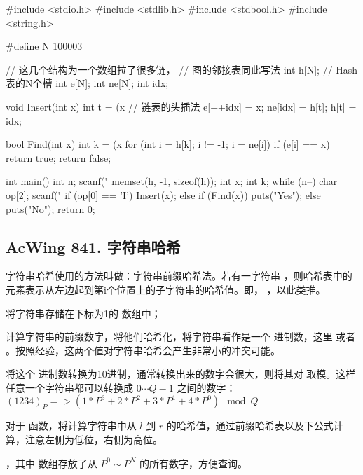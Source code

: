 \begin{mycpptwocol}[拉链法]
    #include <stdio.h>
    #include <stdlib.h>
    #include <stdbool.h>
    #include <string.h>

    #define N 100003

    // 这几个结构为一个数组拉了很多链，
    // 图的邻接表同此写法
    int h[N]; // Hash表的N个槽
    int e[N];
    int ne[N];
    int idx;

    void Insert(int x) {
        int t = (x %
        // 链表的头插法
        e[++idx] = x;
        ne[idx] = h[t];
        h[t] = idx;
    }

    bool Find(int x) {
        int k = (x %
        for (int i = h[k]; i != -1; i = ne[i]) {
            if (e[i] == x) {
                return true;
            }
        }
        return false;
    }

    int main() {
        int n;
        scanf("%
        memset(h, -1, sizeof(h));
        int x;
        int k;
        while (n--) {
            char op[2];
            scanf("%
            if (op[0] == 'I') {
                Insert(x);
            } else {
                if (Find(x)) {
                    puts("Yes");
                } else {
                    puts("No");
                }
            }
        }
        return 0;
    }
\end{mycpptwocol}

\subsection{AcWing 841. 字符串哈希}

字符串哈希使用的方法叫做：字符串前缀哈希法。若有一字符串 ，则哈希表中的元素表示从左边起到第i个位置上的子字符串的哈希值。即， ，以此类推。

\begin{myenum}
    \item 将字符串存储在下标为1的  数组中；
    \item 计算字符串的前缀数字，将他们哈希化，将字符串看作是一个  进制数，这里  或者 。按照经验，这两个值对字符串哈希会产生非常小的冲突可能。
    \item 将这个  进制数转换为10进制，通常转换出来的数字会很大，则将其对  取模。这样任意一个字符串都可以转换成 $0 \cdots Q - 1$ 之间的数字：$(1234)_P => (1 * P^3 + 2 * P^2 + 3 * P^1 + 4 * P^0) \mod Q$
    \item 对于  函数，将计算字符串中从 $l$ 到 $r$ 的哈希值，通过前缀哈希表以及下公式计算，注意左侧为低位，右侧为高位。

     ，其中  数组存放了从 $P^0 \sim P^N$ 的所有数字，方便查询。
\end{myenum}

